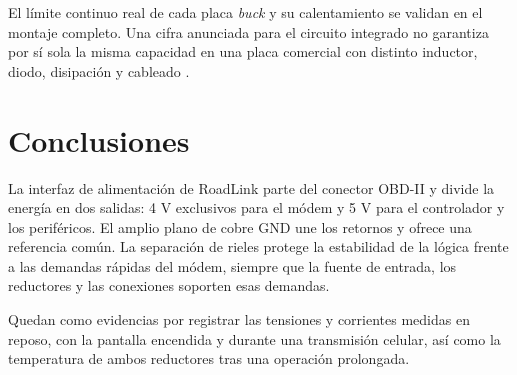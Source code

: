 \documentclass[11pt,letterpaper]{article}
\begin{document}
El límite continuo real de cada placa \emph{buck} y su calentamiento se validan
en el montaje completo. Una cifra anunciada para el circuito integrado no
garantiza por sí sola la misma capacidad en una placa comercial con distinto
inductor, diodo, disipación y cableado \cite{buck}.

\section{Conclusiones}

La interfaz de alimentación de RoadLink parte del conector OBD-II y divide la
energía en dos salidas: 4 V exclusivos para el módem y 5 V para el controlador y
los periféricos. El amplio plano de cobre GND une los retornos y ofrece una
referencia común. La separación de rieles protege la estabilidad de la lógica
frente a las demandas rápidas del módem, siempre que la fuente de entrada, los
reductores y las conexiones soporten esas demandas.

Quedan como evidencias por registrar las tensiones y corrientes medidas en
reposo, con la pantalla encendida y durante una transmisión celular, así como
la temperatura de ambos reductores tras una operación prolongada.
\end{document}

